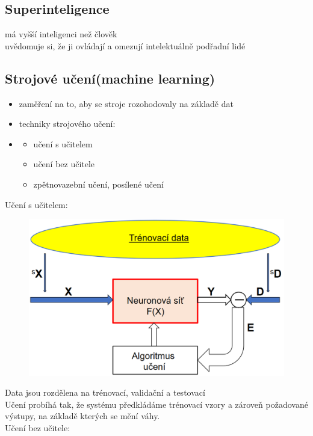 \subsection*{Superinteligence}
má vyšší inteligenci než člověk\\
uvědomuje si, že ji ovládají a omezují intelektuálně podřadní lidé\\



\subsection*{Strojové učení(machine learning)}
\begin{itemize}
    \item zaměření na to, aby se stroje rozohodovaly na základě dat
    \item techniky strojového učení:
    \item \begin{itemize}
        \item učení s učitelem
        \item učení bez učitele
        \item zpětnovazební učení, posílené učení
    \end{itemize}
\end{itemize}
Učení s učitelem:
\begin{figure}[H]
    \includegraphics[scale = 0.3]{images/sUcitelem.png}
\end{figure}
Data jsou rozdělena na trénovací, validační a testovací\\
Učení probíhá tak, že systému předkládáme trénovací vzory a zároveň požadované výstupy, na základě kterých se mění váhy.\\
\newpage
Učení bez učitele:
